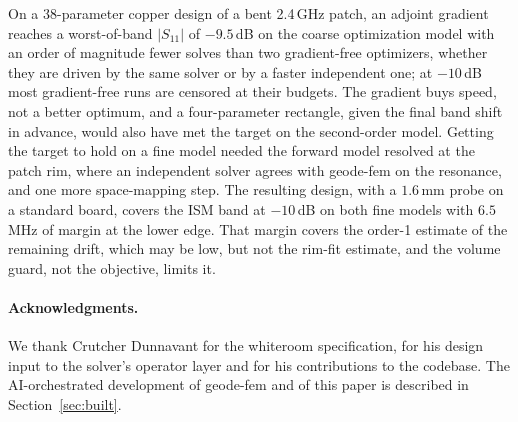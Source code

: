 \documentclass{anvil-paper}
\begin{document}
On a 38-parameter copper design of a bent 2.4\,GHz patch, an adjoint
gradient reaches a worst-of-band $|S_{11}|$ of $-9.5$\,dB on the coarse
optimization model with an order of magnitude fewer solves than two
gradient-free optimizers, whether they are driven by the same solver or by
a faster independent one; at $-10$\,dB most gradient-free runs are censored
at their budgets. The gradient buys speed, not a better optimum, and a
four-parameter rectangle, given the final band shift in advance, would also
have met the target on the second-order model. Getting the target to hold
on a fine model needed the forward model resolved at the patch rim, where an
independent solver agrees with geode-fem on the resonance, and one more
space-mapping step. The resulting design, with a $1.6$\,mm probe on a
standard board, covers the ISM band at $-10$\,dB on both fine models with
$6.5$\,MHz of margin at the lower edge. That margin covers the order-1
estimate of the remaining drift, which may be low, but not the rim-fit
estimate, and the volume guard, not the objective, limits it.

\paragraph{Acknowledgments.}
We thank Crutcher Dunnavant for the whiteroom specification, for his
design input to the solver's operator layer and for his contributions to
the codebase. The AI-orchestrated development of geode-fem and of this
paper is described in Section~\ref{sec:built}.



\end{document}
